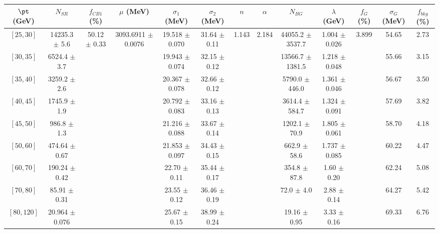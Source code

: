 \begin{tabular}{c||c|c|c|c|c|c|c|c|c|c|c||c}
$\pt$ (GeV) & $N_{SR}$ & $f_{CB1}$ (\%) & $\mu$ (MeV) & $\sigma_1$ (MeV) & $\sigma_2$ (MeV) & $n$ & $\alpha$ & $N_{BG}$ & $\lambda$ (GeV) & $f_G$ (\%) & $\sigma_G$ (MeV) & $f_{bkg}$ (\%) \\
\hline
$[25, 30]$ & 14235.3 $\pm$ 5.6 & \multirow{9}{*}{50.12 $\pm$ 0.33} & \multirow{9}{*}{3093.6911 $\pm$ 0.0076} & 19.518 $\pm$ 0.070 & 31.64 $\pm$ 0.11 & \multirow{9}{*}{1.143} & \multirow{9}{*}{2.184} & 44055.2 $\pm$ 3537.7 & 1.004 $\pm$ 0.026 & \multirow{9}{*}{3.899} & 54.65 & 2.73\\
$[30, 35]$ & 6524.4 $\pm$ 3.7 &  &  & 19.943 $\pm$ 0.074 & 32.15 $\pm$ 0.12 &  &  & 13566.7 $\pm$ 1381.5 & 1.218 $\pm$ 0.048 &  & 55.66 & 3.15\\
$[35, 40]$ & 3259.2 $\pm$ 2.6 &  &  & 20.367 $\pm$ 0.078 & 32.66 $\pm$ 0.12 &  &  & 5790.0 $\pm$ 446.0 & 1.361 $\pm$ 0.046 &  & 56.67 & 3.50\\
$[40, 45]$ & 1745.9 $\pm$ 1.9 &  &  & 20.792 $\pm$ 0.083 & 33.16 $\pm$ 0.13 &  &  & 3614.4 $\pm$ 584.7 & 1.324 $\pm$ 0.091 &  & 57.69 & 3.82\\
$[45, 50]$ & 986.8 $\pm$ 1.3 &  &  & 21.216 $\pm$ 0.088 & 33.67 $\pm$ 0.14 &  &  & 1202.1 $\pm$ 70.9 & 1.805 $\pm$ 0.061 &  & 58.70 & 4.18\\
$[50, 60]$ & 474.64 $\pm$ 0.67 &  &  & 21.853 $\pm$ 0.097 & 34.43 $\pm$ 0.15 &  &  & 662.9 $\pm$ 58.6 & 1.737 $\pm$ 0.085 &  & 60.22 & 4.47\\
$[60, 70]$ & 190.24 $\pm$ 0.42 &  &  & 22.70 $\pm$ 0.11 & 35.44 $\pm$ 0.17 &  &  & 354.8 $\pm$ 87.8 & 1.60 $\pm$ 0.20 &  & 62.24 & 5.08\\
$[70, 80]$ & 85.91 $\pm$ 0.31 &  &  & 23.55 $\pm$ 0.12 & 36.46 $\pm$ 0.19 &  &  & 72.0 $\pm$ 4.0 & 2.88 $\pm$ 0.14 &  & 64.27 & 5.42\\
$[80, 120]$ & 20.964 $\pm$ 0.076 &  &  & 25.67 $\pm$ 0.15 & 38.99 $\pm$ 0.24 &  &  & 19.16 $\pm$ 0.95 & 3.33 $\pm$ 0.16 &  & 69.33 & 6.76\\
\end{tabular}
